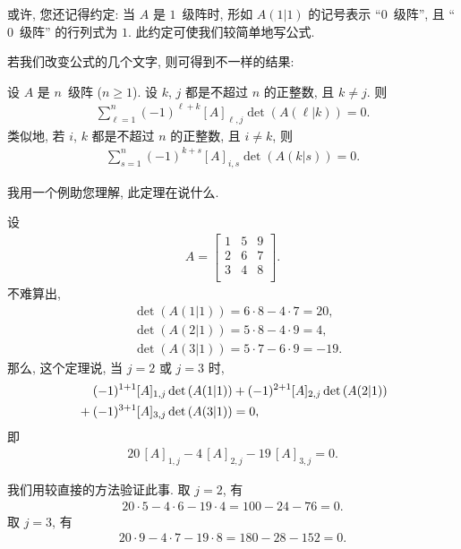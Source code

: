 \TheoremExpansionAboutAnyColumn*

\TheoremExpansionAboutAnyRow*

或许, 您还记得约定:
当 \(A\) 是 \(1\)~级阵时,
形如 \(A(1|1)\) 的记号表示 ``\(0\)~级阵'',
且 ``\(0\)~级阵'' 的行列式为 \(1\).
此约定可使我们较简单地写公式.

若我们改变公式的几个文字,
则可得到不一样的结果:

\begin{theorem}
    设 \(A\) 是 \(n\)~级阵 (\(n \geq 1\)).
    设 \(k\), \(j\) 都是不超过 \(n\) 的正整数,
    且 \(k \neq j\).
    则
    \begin{align*}
        \sum_{\ell = 1}^{n}
        {(-1)^{\ell+k} [A]_{\ell,j} \det {(A(\ell|k))}}
        = 0.
    \end{align*}
    类似地, 若 \(i\), \(k\) 都是不超过 \(n\) 的正整数,
    且 \(i \neq k\),
    则
    \begin{align*}
        \sum_{s = 1}^{n}
        {(-1)^{k+s} [A]_{i,s} \det {(A(k|s))}}
        = 0.
    \end{align*}
\end{theorem}

我用一个例助您理解, 此定理在说什么.

\begin{example}
    设
    \begin{align*}
        A =
        \begin{bmatrix}
            1 & 5 & 9 \\
            2 & 6 & 7 \\
            3 & 4 & 8 \\
        \end{bmatrix}.
    \end{align*}
    不难算出,
    \begin{align*}
         & \det {(A(1|1))} = 6 \cdot 8 - 4 \cdot 7 = 20,  \\
         & \det {(A(2|1))} = 5 \cdot 8 - 4 \cdot 9 = 4,   \\
         & \det {(A(3|1))} = 5 \cdot 7 - 6 \cdot 9 = -19.
    \end{align*}
    那么, 这个定理说, 当 \(j = 2\) 或 \(j = 3\) 时,
    \begin{align*}
         & \hphantom{{} + {}}
        (-1)^{1+1} [A]_{1,j} \det {(A(1|1))}
        + (-1)^{2+1} [A]_{2,j} \det {(A(2|1))}
        \\
         &
        + (-1)^{3+1} [A]_{3,j} \det {(A(3|1))} = 0,
    \end{align*}
    即
    \begin{align*}
        20\,[A]_{1,j} - 4\,[A]_{2,j} - 19\,[A]_{3,j} = 0.
    \end{align*}

    我们用较直接的方法验证此事.
    取 \(j = 2\), 有
    \begin{align*}
        20 \cdot 5 - 4 \cdot 6 - 19 \cdot 4 = 100 - 24 - 76 = 0.
    \end{align*}
    取 \(j = 3\), 有
    \begin{align*}
        20 \cdot 9 - 4 \cdot 7 - 19 \cdot 8 = 180 - 28 - 152 = 0.
    \end{align*}
\end{example}

